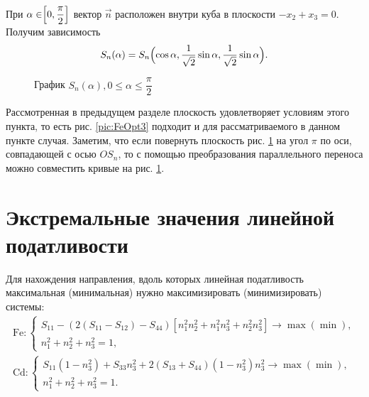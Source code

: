 \documentclass[12pt,a4paper]{article}
\newcommand{\picref}[1]{рис. \ref{#1}}
\begin{document}
 При $\alpha \in \Bigr[ 0, \dfrac{\pi}{2} \Bigl]$ вектор $ \vec n $ расположен внутри куба в плоскости $ -x_2 + x_3 = 0 $. Получим зависимость 
 \[
	S_n(\alpha) = S_n \Bigl( \cos \alpha, \dfrac{1}{\sqrt 2} \sin \alpha, \dfrac{1}{\sqrt 2} \sin \alpha \Bigr).
 \] 

 \begin{figure}[h]
	\caption{График $S_n(\alpha), 0 \leq \alpha \leq \dfrac{\pi}{2}$}
	\label{pic:FeOpt4}
\end{figure}

 Рассмотренная в предыдущем разделе плоскость удовлетворяет условиям этого пункта, то есть \picref{pic:FeOpt3} подходит и для рассматриваемого в данном пункте случая. Заметим, что если повернуть плоскость \picref{pic:FeOpt4} на угол $\pi$ по оси, совпадающей с осью $OS_n$, то с помощью преобразования параллельного переноса можно совместить кривые на \picref{pic:FeOpt4}.

 \section{Экстремальные значения линейной податливости}

 Для нахождения направления, вдоль которых линейная податливость максимальная (минимальная) нужно максимизировать (минимизировать) системы:
 \begin{gather*}
    \text{Fe}\colon \begin{cases}
        S_{11} - (2(S_{11} - S_{12}) - S_{44}) [n_1^2n_2^2 + n_1^2n_3^2 + n_2^2n_3^2] \rightarrow \max(\min),\\
        n_1^2 + n_2^2 + n_3^2 = 1, 
    \end{cases} \\[0.7em]
    \text{Cd}\colon \begin{cases}
        S_{11}(1 - n_3^2) + S_{33}n_3^2 + 2(S_{13} + S_{44})(1-n_3^2)n_3^2 \rightarrow \max(\min),\\
        n_1^2 + n_2^2 + n_3^2 = 1.
    \end{cases} \\
\end{gather*}
\end{document}
